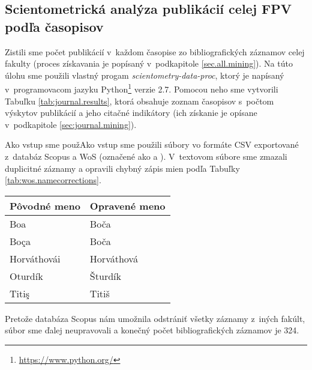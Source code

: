 \subsection{Scientometrická analýza publikácií celej FPV podľa časopisov}

Zistili sme počet publikácií v~každom časopise zo bibliografických záznamov
celej fakulty (proces získavania je popísaný v~podkapitole
\ref{sec.all.mining}).  Na túto úlohu sme použili vlastný progam
\emph{scientometry-data-proc}, ktorý je napísaný v~programovacom jazyku
Python\footnote{\url{https://www.python.org/}} verzie 2.7.  Pomocou neho sme
vytvorili  Tabuľku \ref{tab:journal.results}, ktorá obsahuje zoznam časopisov
s~počtom výskytov publikácií a jeho citačné indikátory (ich získanie je opísane
v~podkapitole \ref{sec:journal.mining}). 


Ako vstup sme použAko vstup sme použili súbory vo formáte CSV exportované
z~databáz Scopus a WoS (označené ako  a
).  V~textovom súbore
 sme zmazali duplicitné záznamy a opravili
chybný zápis mien podľa Tabuľky \ref{tab:wos.namecorrections}.

\begin{SCtable}
\caption{Oprava chýb v~menách autorov v~súbore .}
\label{tab:wos.namecorrections}
\centering\small
\begin{tabular}{ll}
  \toprule\noalign{\vspace{.3ex}}
  Pôvodné meno & Opravené meno \\[0.3ex]
  \midrule\noalign{\vspace{.5ex}}
  Boa          & Boča       \\
  Boça         & Boča       \\
  Horváthovái  & Horváthová \\
  Oturdík      & Šturdík    \\
  Titiş        & Titiš      \\[0.5ex]
  \bottomrule
\end{tabular}
\end{SCtable}

Pretože databáza Scopus nám umožnila odstrániť všetky záznamy z~iných fakúlt,
súbor  sme ďalej neupravovali a konečný počet
bibliografických záznamov je 324.

